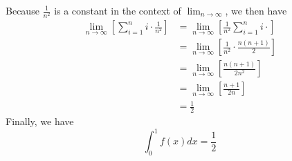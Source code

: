 \documentclass[10pt]{article}
\begin{document}
Because $\frac{1}{n^2}$ is a constant in the context of {\footnotesize$\displaystyle\lim_{n\to\infty}$}, we then have
$$
    \begin{aligned}
        \lim_{n\to\infty}\left[\sum_{i=1}^n i\cdot \frac{1}{n^2}\right] & = \lim_{n\to\infty}\left[\frac{1}{n^2}\sum_{i=1}^n i\cdot\right]  \\
                                                                        & =\lim_{n\to\infty}\left[\frac{1}{n^2}\cdot\frac{n(n+1)}{2}\right] \\
                                                                        & =\lim_{n\to\infty}\left[\frac{n(n+1)}{2n^2}\right]                \\
                                                                        & =\lim_{n\to\infty}\left[\frac{n+1}{2n}\right]                     \\
                                                                        & =\frac{1}{2}
    \end{aligned}
$$
Finally, we have
$$
    \int_0^1f(x)dx=\frac{1}{2}
$$
\end{document}
